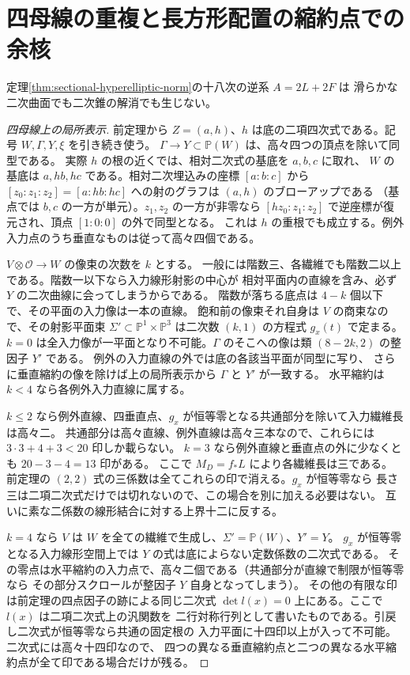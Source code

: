 \section{四母線の重複と長方形配置の縮約点での余核}
\label{sec:sectional-hyperelliptic-grid}
\begin{theorem}\label{thm:sectional-hyperelliptic-grid}
定理\ref{thm:sectional-hyperelliptic-norm}の十八次の逆系 $A=2L+2F$ は
滑らかな二次曲面でも二次錐の解消でも生じない。
\end{theorem}
\begin{proof}[四母線上の局所表示]
前定理から $Z=(a,h)$、$h$ は底の二項四次式である。記号 $W,\Gamma,Y,\xi$ を引き続き使う。
$\Gamma\to Y\subset\mathbb P(W)$ は、高々四つの頂点を除いて同型である。
実際 $h$ の根の近くでは、相対二次式の基底を $a,b,c$ に取れ、
$W$ の基底は $a,hb,hc$ である。相対二次埋込みの座標 $[a:b:c]$ から
$[z_0:z_1:z_2]=[a:hb:hc]$ への射のグラフは $(a,h)$ のブローアップである
（基点では $b,c$ の一方が単元）。$z_1,z_2$ の一方が非零なら
$[h z_0:z_1:z_2]$ で逆座標が復元され、頂点 $[1:0:0]$ の外で同型となる。
これは $h$ の重根でも成立する。例外入力点のうち垂直なものは従って高々四個である。

$V\otimes\mathcal O\to W$ の像束の次数を $k$ とする。
一般には階数三、各繊維でも階数二以上である。階数一以下なら入力線形射影の中心が
相対平面内の直線を含み、必ず $Y$ の二次曲線に会ってしまうからである。
階数が落ちる底点は $4-k$ 個以下で、その平面の入力像は一本の直線。
飽和前の像束それ自身は $V$ の商束なので、その射影平面束
$\Sigma'\subset\mathbb P^1\times\mathbb P^3$ は二次数 $(k,1)$ の方程式 $g_x(t)$ で定まる。
$k=0$ は全入力像が一平面となり不可能。$\Gamma$ のそこへの像は類 $(8-2k,2)$ の整因子 $Y'$ である。
例外の入力直線の外では底の各該当平面が同型に写り、
さらに垂直縮約の像を除けば上の局所表示から $\Gamma$ と $Y'$ が一致する。
水平縮約は $k<4$ なら各例外入力直線に属する。

$k\le2$ なら例外直線、四垂直点、$g_x$ が恒等零となる共通部分を除いて入力繊維長は高々二。
共通部分は高々直線、例外直線は高々三本なので、これらには $3\cdot3+4+3<20$ 印しか載らない。
$k=3$ なら例外直線と垂直点の外に少なくとも $20-3-4=13$ 印がある。
ここで $M_D=f_*L$ により各繊維長は三である。
前定理の $(2,2)$ 式の三係数は全てこれらの印で消える。$g_x$ が恒等零なら
長さ三は二項二次式だけでは切れないので、この場合を別に加える必要はない。
互いに素な二係数の線形結合に対する上界十二に反する。

$k=4$ なら $V$ は $W$ を全ての繊維で生成し、$\Sigma'=\mathbb P(W)$、$Y'=Y$。
$g_x$ が恒等零となる入力線形空間上では $Y$ の式は底によらない定数係数の二次式である。
その零点は水平縮約の入力点で、高々二個である（共通部分が直線で制限が恒等零なら
その部分スクロールが整因子 $Y$ 自身となってしまう）。
その他の有限な印は前定理の四点因子の跡による同じ二次式
$\det l(x)=0$ 上にある。ここで $l(x)$ は二項二次式上の汎関数を
二行対称行列として書いたものである。引戻し二次式が恒等零なら共通の固定根の
入力平面に十四印以上が入って不可能。二次式には高々十四印なので、
四つの異なる垂直縮約点と二つの異なる水平縮約点が全て印である場合だけが残る。
\end{proof}

